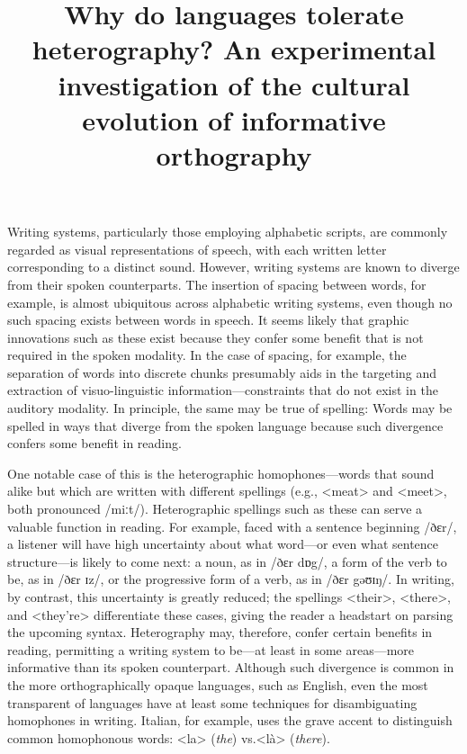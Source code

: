 \documentclass[doc,biblatex]{apa7}
\title{Why do languages tolerate heterography? An experimental investigation of the cultural evolution of informative orthography}
\begin{document}
\maketitle

\noindent
Writing systems, particularly those employing alphabetic scripts, are commonly regarded as visual representations of speech, with each written letter corresponding to a distinct sound. However, writing systems are known to diverge from their spoken counterparts. The insertion of spacing between words, for example, is almost ubiquitous across alphabetic writing systems, even though no such spacing exists between words in speech. It seems likely that graphic innovations such as these exist because they confer some benefit that is not required in the spoken modality. In the case of spacing, for example, the separation of words into discrete chunks presumably aids in the targeting and extraction of visuo-linguistic information---constraints that do not exist in the auditory modality. In principle, the same may be true of spelling: Words may be spelled in ways that diverge from the spoken language because such divergence confers some benefit in reading.

One notable case of this is the heterographic homophones---words that sound alike but which are written with different spellings (e.g., <meat> and <meet>, both pronounced /miːt/). Heterographic spellings such as these can serve a valuable function in reading. For example, faced with a sentence beginning /ðɛr/, a listener will have high uncertainty about what word---or even what sentence structure---is likely to come next: a noun, as in /ðɛr dɒg/, a form of the verb to be, as in /ðɛr ɪz/, or the progressive form of a verb, as in /ðɛr gəʊɪŋ/. In writing, by contrast, this uncertainty is greatly reduced; the spellings <their>, <there>, and <they're> differentiate these cases, giving the reader a headstart on parsing the upcoming syntax. Heterography may, therefore, confer certain benefits in reading, permitting a writing system to be---at least in some areas---more informative than its spoken counterpart. Although such divergence is common in the more orthographically opaque languages, such as English, even the most transparent of languages have at least some techniques for disambiguating homophones in writing. Italian, for example, uses the grave accent to distinguish common homophonous words: <la> (\textit{the}) vs.\@ <là> (\textit{there}).

\end{document}
